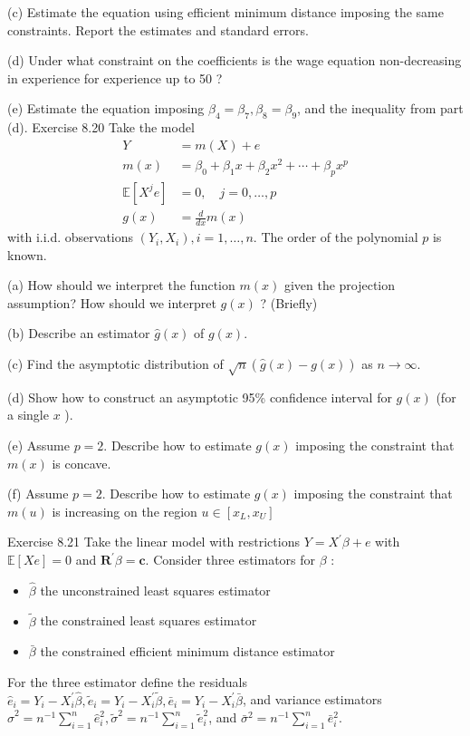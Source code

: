 \documentclass[10pt]{article}
\begin{document}
(c) Estimate the equation using efficient minimum distance imposing the same constraints. Report the estimates and standard errors.

(d) Under what constraint on the coefficients is the wage equation non-decreasing in experience for experience up to 50 ?

(e) Estimate the equation imposing $\beta_{4}=\beta_{7}, \beta_{8}=\beta_{9}$, and the inequality from part (d). Exercise 8.20 Take the model
$$
\begin{aligned}
Y &=m(X)+e \\
m(x) &=\beta_{0}+\beta_{1} x+\beta_{2} x^{2}+\cdots+\beta_{p} x^{p} \\
\mathbb{E}\left[X^{j} e\right] &=0, \quad j=0, \ldots, p \\
g(x) &=\frac{d}{d x} m(x)
\end{aligned}
$$
with i.i.d. observations $\left(Y_{i}, X_{i}\right), i=1, \ldots, n$. The order of the polynomial $p$ is known.

(a) How should we interpret the function $m(x)$ given the projection assumption? How should we interpret $g(x)$ ? (Briefly)

(b) Describe an estimator $\widehat{g}(x)$ of $g(x)$.

(c) Find the asymptotic distribution of $\sqrt{n}(\widehat{g}(x)-g(x))$ as $n \rightarrow \infty$.

(d) Show how to construct an asymptotic 95\% confidence interval for $g(x)$ (for a single $x$ ).

(e) Assume $p=2$. Describe how to estimate $g(x)$ imposing the constraint that $m(x)$ is concave.

(f) Assume $p=2$. Describe how to estimate $g(x)$ imposing the constraint that $m(u)$ is increasing on the region $u \in\left[x_{L}, x_{U}\right]$

Exercise 8.21 Take the linear model with restrictions $Y=X^{\prime} \beta+e$ with $\mathbb{E}[X e]=0$ and $\boldsymbol{R}^{\prime} \beta=\boldsymbol{c}$. Consider three estimators for $\beta$ :

\begin{itemize}
  \item $\widehat{\beta}$ the unconstrained least squares estimator

  \item $\widetilde{\beta}$ the constrained least squares estimator

  \item $\bar{\beta}$ the constrained efficient minimum distance estimator

\end{itemize}
For the three estimator define the residuals $\widehat{e}_{i}=Y_{i}-X_{i}^{\prime} \widehat{\beta}, \widetilde{e}_{i}=Y_{i}-X_{i}^{\prime} \widetilde{\beta}, \bar{e}_{i}=Y_{i}-X_{i}^{\prime} \bar{\beta}$, and variance estimators $\widehat{\sigma}^{2}=n^{-1} \sum_{i=1}^{n} \widehat{e}_{i}^{2}, \widetilde{\sigma}^{2}=n^{-1} \sum_{i=1}^{n} \widetilde{e}_{i}^{2}$, and $\bar{\sigma}^{2}=n^{-1} \sum_{i=1}^{n} \bar{e}_{i}^{2}$.
\end{document}
